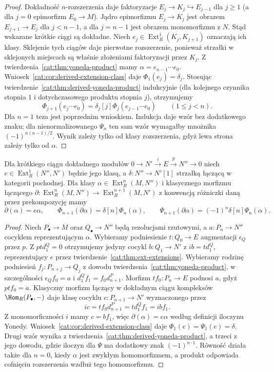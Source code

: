 \begin{proof}
Dokładność $n$-rozszerzenia daje faktoryzacje $E_j\to K_j\hookrightarrow E_{j-1}$ dla $j\ge1$ (a dla $j=0$ epimorfizm $E_0\to M$). Jądro epimorfizmu $E_j\to K_j$ jest obrazem $E_{j+1}\to E_j$ dla $j<n-1$, a dla $j=n-1$ jest obrazem monomorfizmu z $N$. Stąd wskazane krótkie ciągi są dokładne. Niech $e_j\in\operatorname{Ext}_R^1(K_j,K_{j+1})$ oznaczają ich klasy. Sklejenie tych ciągów daje pierwotne rozszerzenie, ponieważ strzałki w sklejonych miejscach są właśnie złożeniami faktoryzacji przez $K_j$. Z twierdzenia~\ref{cat:thm:yoneda-product} mamy $\alpha=e_{n-1}\cdots e_0$. Wniosek~\ref{cat:cor:derived-extension-class} daje $\Phi_1(e_j)=\delta_j$. Stosując twierdzenie~\ref{cat:thm:derived-yoneda-product} indukcyjnie (dla kolejnego czynnika stopnia $1$ i dotychczasowego produktu stopnia $j$), otrzymujemy
\[
 \Phi_{j+1}(e_j\cdots e_0)=\delta_j[j]\Phi_j(e_{j-1}\cdots e_0)
 \qquad(1\le j<n).
\]
Dla $n=1$ teza jest poprzednim wnioskiem. Indukcja daje wzór bez dodatkowego znaku; dla nienormalizowanego $\Psi_n$ ten sam wzór wymagałby mnożnika $(-1)^{n(n-1)/2}$. Wynik zależy tylko od klasy rozszerzenia, gdyż lewa strona zależy tylko od $\alpha$.
\end{proof}
\begin{stwierdzenie}\label{cat:prop:derived-ext-connecting}
Dla krótkiego ciągu dokładnego modułów $0\to N'\xrightarrow i E\xrightarrow p N''\to0$ niech $e\in\operatorname{Ext}_R^1(N'',N')$ będzie jego klasą, a $\delta:N''\to N'[1]$ strzałką łączącą w kategorii pochodnej. Dla klasy $\alpha\in\operatorname{Ext}_R^n(M,N'')$ i klasycznego morfizmu łączącego $\partial:\operatorname{Ext}_R^n(M,N'')\to\operatorname{Ext}_R^{n+1}(M,N')$ z konwencją różniczki daną przez prekompozycję mamy
\[
 \partial(\alpha)=e\alpha,\qquad
 \Phi_{n+1}(\partial\alpha)=\delta[n]\Phi_n(\alpha),
 \qquad
 \Psi_{n+1}(\partial\alpha)=(-1)^n\delta[n]\Psi_n(\alpha).
\]
\end{stwierdzenie}
\begin{proof}
Niech $P_\bullet\to M$ oraz $Q_\bullet\to N''$ będą rezolucjami rzutowymi, a $a:P_n\to N''$ cocyklem reprezentującym $\alpha$. Wybieramy podniesienie $t:Q_0\to E$ augmentacji $\epsilon_Q$ przez $p$. Z $ptd_1^Q=0$ otrzymujemy jedyny cocykl $b:Q_1\to N'$ z $ib=td_1^Q$, reprezentujący $e$ przez twierdzenie~\ref{cat:thm:ext-extensions}. Wybieramy rodzinę podniesień $f_j:P_{n+j}\to Q_j$ z dowodu twierdzenia~\ref{cat:thm:yoneda-product}, w szczególności $\epsilon_Qf_0=a$ i $d_1^Qf_1=f_0d_{n+1}^P$. Morfizm $tf_0:P_n\to E$ podnosi $a$, gdyż $ptf_0=a$. Klasyczny morfizm łączący w dokładnym ciągu kompleksów $\Hom_R(P_\bullet,-)$ daje klasę cocyklu $c:P_{n+1}\to N'$ wyznaczonego przez
\[
 ic=tf_0d_{n+1}^P=td_1^Qf_1=ibf_1.
\]
Z monomorficzności $i$ mamy $c=bf_1$, więc $\partial(\alpha)=e\alpha$ według definicji iloczynu Yonedy. Wniosek~\ref{cat:cor:derived-extension-class} daje $\Phi_1(e)=\Psi_1(e)=\delta$. Drugi wzór wynika z twierdzenia~\ref{cat:thm:derived-yoneda-product}, a trzeci z jego dowodu, gdzie iloczyn dla $\Psi$ ma dodatkowy znak $(-1)^{n\cdot1}$. Równość działa także dla $n=0$, kiedy $\alpha$ jest zwykłym homomorfizmem, a produkt odpowiada cofnięciu rozszerzenia wzdłuż tego homomorfizmu.
\end{proof}
